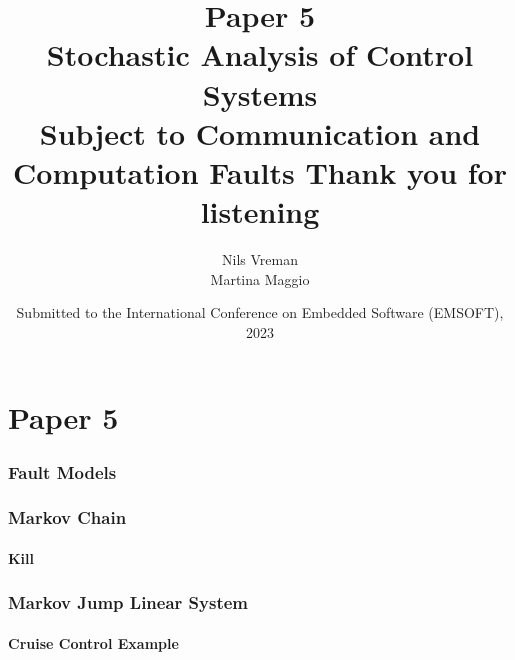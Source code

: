 \section{Paper 5}

\title[PhD Defence]{
    {\Huge Paper 5} \\
    \vspace{2mm}
    {\Large Stochastic Analysis of Control Systems}\\
    {\Large Subject to Communication and Computation Faults}
}
\author[Nils Vreman]{
    Nils Vreman \\
    \vspace{3mm}
    {\large Martina Maggio}
}
\date[EMSOFT 2023]{
    Submitted to the International Conference on Embedded Software (EMSOFT), 2023\\
}
\notitlelogo
{}


\begin{frame}
    \frametitle{Fault Models}
    \begin{figure}
        \centering
        \only<2>{}%
        \only<3>{}%
    \end{figure}
\end{frame}

\begin{frame}
    \frametitle{Markov Chain}%
    \framesubtitle{Kill}%
    \vspace{-2em}
    \begin{figure}
        \centering
        \only<2>{}%
        \only<3>{}%
    \end{figure}
\end{frame}

\begin{frame}
    \frametitle{Markov Jump Linear System}%
    \framesubtitle{Cruise Control Example}
    \begin{figure}
        \centering
    \end{figure}
\end{frame}



\title[Preperatory Seminar]{%
    {\Huge Thank you for listening}
}
\author[Nils Vreman]{}
\date[]{}
\notitlelogo{}
